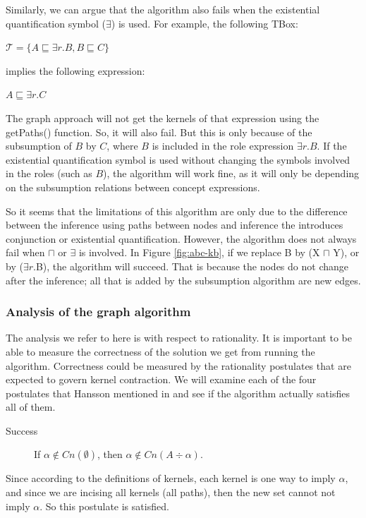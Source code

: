 Similarly, we can argue that the algorithm also fails when the existential quantification symbol ($\exists$) is used. For example, the following TBox:
\begin{center}
$\mathcal{T} = \lbrace A \sqsubseteq \exists r.B, B \sqsubseteq C \rbrace$
\end{center}
implies the following expression:
\begin{center}
$A \sqsubseteq \exists r.C$
\end{center}
The graph approach will not get the kernels of that expression using the getPaths() function. So, it will also fail. But this is only because of the subsumption of $B$ by $C$, where $B$ is included in the role expression $\exists r.B$. If the existential quantification symbol is used without changing the symbols involved in the roles (such as $B$), the algorithm will work fine, as it will only be depending on the subsumption relations between concept expressions.

So it seems that the limitations of this algorithm are only due to the difference between the inference using paths between nodes and inference the introduces conjunction or existential quantification. However, the algorithm does not always fail when $\sqcap$ or $\exists$ is involved. In Figure \ref{fig:abc-kb}, if we replace B by (X $\sqcap$ Y), or by  ($\exists r.$B), the algorithm will succeed. That is because the nodes do not change after the inference; all that is added by the subsumption algorithm are new edges. 


\subsubsection{Analysis of the graph algorithm}
The analysis we refer to here is with respect to rationality. It is important to be able to measure the correctness of the solution we get from running the algorithm. Correctness could be measured by the rationality postulates that are expected to govern kernel contraction. We will examine each of the four postulates that Hansson mentioned in \cite{hansson} and see if the algorithm actually satisfies all of them.

\begin{description}
\item[Success] If $\alpha \notin Cn(\emptyset)$, then $\alpha \notin Cn(A \div \alpha)$.
\end{description}
Since according to the definitions of kernels, each kernel is one way to imply $\alpha$, and since we are incising all kernels (all paths), then the new set cannot not imply $\alpha$. So this postulate is satisfied.

